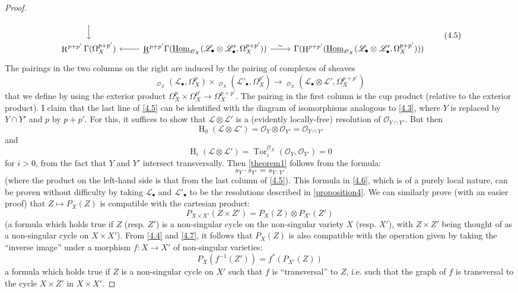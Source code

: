 \documentclass{article}
\theoremstyle{plain}
\theoremstyle{definition}
\newcommand{\sh}[1]{{\mathscr{#1}}}
\DeclareMathOperator{\Tor}{Tor}
\DeclareMathOperator{\shHom}{\underline{Hom}}
\DeclareMathOperator{\RR}{R}
\DeclareMathOperator{\HH}{H}
\newcommand{\oldpage}[1]{\marginpar{\footnotesize$\Big\vert$ \textit{p.~#1}}}
\begin{document}
\begin{proof}
\[\begin{tikzcd}
        \dar
    \\\RR^{p+p'}\Gamma(\Omega_X^{p+p'})
      & \underline{\RR}^{p+p'}\Gamma(\shHom_{\sh{O}_X}(\sh{L}_\bullet\otimes\sh{L}'_\bullet,\Omega_X^{p+p'}))
        \lar \rar["\sim"]
      & \Gamma(\HH^{p+p'}(\shHom_{\sh{O}_X}(\sh{L}_\bullet\otimes\sh{L}'_\bullet,\Omega_X^{p+p'})))
    \end{tikzcd}
    \normalsize
  \tag{4.5}
  \]
\oldpage{149-12}
  The pairings in the two columns on the right are induced by the pairing of complexes of sheaves
  \[
    \shHom_{\sh{O}_X}(\sh{L}_\bullet,\Omega_X^p) \times \shHom_{\sh{O}_X}(\sh{L}'_\bullet,\Omega_X^{p'}) \to \shHom_{\sh{O}_X}(\sh{L}_\bullet\otimes\sh{L}',\Omega_X^{p+p'})
  \]
  that we define by using the exterior product $\Omega_X^p\times\Omega_X^{p'}\to\Omega_X^{p+p'}$.
  The pairing in the first column is the cup product (relative to the exterior product).
  I claim that the last line of \cref{4.5} can be identified with the diagram of isomorphisms analogous to \cref{4.3}, where $Y$ is replaced by $Y\cap Y'$ and $p$ by $p+p'$.
  For this, it suffices to show that $\sh{L}\otimes\sh{L}'$ is a (evidently locally-free) resolution of $\sh{O}_{Y\cap Y'}$.
  But then
  \[
    \HH_0(\sh{L}\otimes\sh{L}') = \sh{O}_Y\otimes\sh{O}_{Y'} = \sh{O}_{Y\cap Y'}
  \]
  and
  \[
    \HH_i(\sh{L}\otimes\sh{L}') = \Tor_i^{\sh{O}_X}(\sh{O}_Y,\sh{O}_{Y'}) = 0
  \]
  for $i>0$, from the fact that $Y$ and $Y'$ intersect transversally.
  Then \cref{theorem1} follows from the formula:
  \[
  \label{4.6}
    s_{Y}\cdot s_{Y'} = s_{Y\cdot Y'}
  \tag{4.6}
  \]
  (where the product on the left-hand side is that from the last column of \cref{4.5}).
  This formula in \cref{4.6}, which is of a purely local nature, can be proven without difficulty by taking $\sh{L}_\bullet$ and $\sh{L}'_\bullet$ to be the resolutions described in \cref{proposition4}.
  We can similarly prove (with an easier proof) that $Z\mapsto P_X(Z)$ is compatible with the cartesian product:
  \[
  \label{4.7}
    P_{X\times X'}(Z\times Z')  = P_X(Z)\otimes P_{X'}(Z')
  \tag{4.7}
  \]
  (a formula which holds true if $Z$ (resp. $Z'$) is a non-singular cycle on the non-singular variety $X$ (resp. $X'$), with $Z\times Z'$ being thought of as a non-singular cycle on $X\times X'$).
  From \cref{4.4} and \cref{4.7}, it follows that $P_X(Z)$ is also compatible with the operation given by taking the ``inverse image'' under a morphism $f\colon X\to X'$ of non-singular varieties:
  \[
  \label{4.8}
    P_X(f^{-1}(Z')) = f^*(P_{X'}(Z))
  \tag{4.8}
  \]
  a formula which holds true if $Z$ is a non-singular cycle on $X'$ such that $f$ is ``transversal'' to $Z$, i.e. such that the graph of $f$ is transversal to the cycle $X\times Z'$ in $X\times X'$.
\end{proof}
\end{document}
